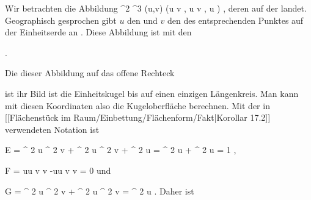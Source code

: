 {

Wir betrachten die Abbildung
\maabbeledisp {\varphi} {\R^2} {\R^3
} {(u,v)} {(\cos  u \cos  v  , \cos  u \sin  v  , \sin  u )
} {,}
deren
auf der  {} landet. Geographisch gesprochen gibt $u$ den  {} und $v$ den  {} des entsprechenden Punktes auf der Einheitserde an
 {} {.}
Diese Abbildung ist
mit den

 { . }

Die
dieser Abbildung auf das offene Rechteck

\mathdisp {{]{- { \frac{   \pi }{  2 } }}, { \frac{   \pi }{  2 } } [} \times {]{-\pi}, \pi[}} {  }

ist
ihr Bild ist die Einheitskugel bis auf einen einzigen Längenkreis. Man kann mit diesen Koordinaten also die Kugeloberfläche berechnen. Mit der in
[[Flächenstück im Raum/Einbettung/Flächenform/Fakt|Korollar 17.2]]
verwendeten Notation ist

\mavergleichskettedisp
{\vergleichskette
{E
}
{ =} { \sin^{ 2  }  u \cos^{ 2  }  v + \sin^{ 2  }  u \sin^{ 2  }  v + \cos^{ 2  }  u
}
{ =} { \sin^{ 2  }  u + \cos^{ 2  }  u
}
{ =} { 1
}
{ } {
}
}
{}{}{,}

\mavergleichskettedisp
{\vergleichskette
{F
}
{ =} { \sin  u\cos  u \sin  v \cos  v  -\sin  u\cos  u \sin  v \cos  v
}
{ =} { 0
}
{ } {
}
{ } {
}
}
{}{}{}
und

\mavergleichskettedisp
{\vergleichskette
{G
}
{ =} { \cos^{ 2  }  u \sin^{ 2  }  v + \cos^{ 2  }  u \cos^{ 2  }  v
}
{ =} { \cos^{ 2  }  u
}
{ } {
}
{ } {
}
}
{}{}{.}
Daher ist

}
